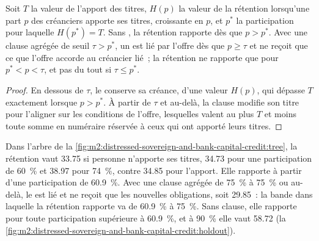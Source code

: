 \begin{proposition}\label{prop:m2:distressed-sovereign-and-bank-capital-credit:band}
Soit $T$ la valeur de l'apport des titres, $H(p)$ la valeur de la rétention lorsqu'une part $p$
des créanciers apporte ses titres, croissante en $p$, et $p^*$ la participation pour laquelle $H(p^*) = T$. Sans , la rétention rapporte dès que $p > p^*$. Avec une clause agrégée
de seuil $\tau > p^*$, un  est lié par l'offre dès que $p \geq \tau$ et ne reçoit
que ce que l'offre accorde au créancier lié~; la rétention ne rapporte que pour $p^* < p < \tau$, et pas
du tout si $\tau \leq p^*$.
\end{proposition}

\begin{proof}
En dessous de $\tau$, le  conserve sa créance, d'une valeur $H(p)$, qui dépasse $T$ exactement lorsque
$p > p^*$. À partir de $\tau$ et au-delà, la clause modifie son titre pour l'aligner sur les conditions de l'offre, lesquelles
valent au plus $T$ et moins toute somme en numéraire réservée à ceux qui ont apporté leurs titres.
\end{proof}

\begin{example}\label{ex:m2:distressed-sovereign-and-bank-capital-credit:band}
Dans l'arbre de la \cref{fig:m2:distressed-sovereign-and-bank-capital-credit:tree}, la rétention
vaut 33.75 si personne n'apporte ses titres, 34.73 pour une participation de 60~\% et 38.97 pour 74~\%,
contre 34.85 pour l'apport. Elle rapporte à partir d'une participation de 60.9~\%. Avec une clause agrégée de 75~\%
à 75~\% ou au-delà, le  est lié et ne reçoit que les nouvelles obligations,
soit 29.85~: la bande dans laquelle la rétention rapporte va de 60.9~\% à 75~\%. Sans clause,
elle rapporte pour toute participation supérieure à 60.9~\%, et à 90~\% elle vaut 58.72
(la \cref{fig:m2:distressed-sovereign-and-bank-capital-credit:holdout}).
\end{example}

